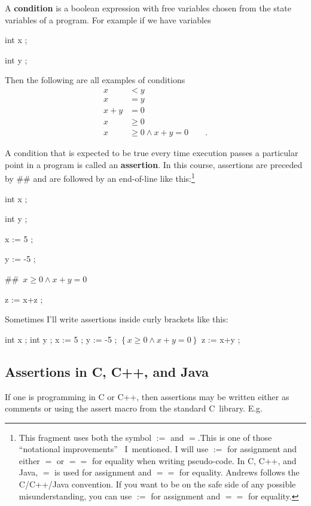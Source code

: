 \documentclass[muchmore,11pt]{article}%
\begin{document}
A \textbf{condition} is a boolean expression with free variables chosen from
the state variables of a program. For example if we have variables

\begin{code}
int x ;

int y ;
\end{code}

Then the following are all examples of conditions%
\begin{align*}
x  &  <y\\
x  &  =y\\
x+y  &  =0\\
x  &  \geq0\\
x  &  \geq0\wedge x+y=0\qquad\text{.}%
\end{align*}


A condition that is expected to be true every time execution passes a
particular point in a program is called an \textbf{assertion}. In this course,
assertions are preceded by \#\# and are followed by an end-of-line like
this:\footnote{This fragment uses both the symbol $:=$ and $=$.This is one of
those \textquotedblleft notational improvements\textquotedblright%
\ I\ mentioned. I will use $:=$ for assignment and either $=$ or $==$ for
equality when writing pseudo-code. In C, C++, and Java, $=$ is used for
assignment and $==$ for equality. Andrews follows the C/C++/Java convention.
If you want to be on the safe side of any possible misunderstanding, you can
use $:=$ for assignment and $==$ for equality.}

\begin{code}
int x ;

int y ;

x := 5 ;

y := -5 ;

\#\#\ $x\geq0\wedge x+y=0$

z := x+z ;
\end{code}

Sometimes I'll write assertions inside curly brackets like this:

\begin{code}
int x ; int y ; x := 5 ; y := -5 ; $\left\{  x\geq0\wedge x+y=0\right\}  $ z
:= x+y ;
\end{code}

\subsection{Assertions in C, C++, and Java}

If one is programming in C or C++, then assertions may be written either as
comments or using the assert macro from the standard C\ library. E.g.
\end{document}
